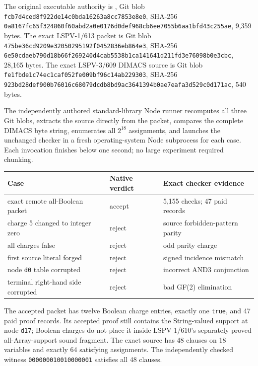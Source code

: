 \documentclass[11pt]{article}
\begin{document}
The original executable authority is
, Git blob
\texttt{fcb7d4ced8f922de14c0bda16263a8cc7853e8e0}, SHA-256
\texttt{0a8167fc65f324860f60abd2a0e0176d0def968cb6ee7055b6aa1bfd43c255ae},
9,359 bytes.  The exact LSPV-1/613 packet is Git blob
\texttt{475be36cd9209e32050295192f0452836eb864e3}, SHA-256
\texttt{6e50cdaeb790d18b66f269240d4cab5538b1ca141641d211fd3e76098b0e3cbc},
28,165 bytes.  The exact LSPV-3/609 DIMACS source is Git blob
\texttt{fe1fbde1c74ec1caf052fe009bf96c14ab229303}, SHA-256
\texttt{923bd28def900b76016c68079dcdb8bd9ac3641394b0ae7eafa3d529c0d171ac},
540 bytes.

The independently authored standard-library Node runner recomputes all three
Git blobs, extracts the source directly from the packet, compares the complete
DIMACS byte string, enumerates all $2^{18}$ assignments, and launches the
unchanged checker in a fresh operating-system Node subprocess for each case.
Each invocation finishes below one second; no large experiment required
chunking.

\begin{center}
\begin{tabular}{lll}
\toprule
Case & Native verdict & Exact checker evidence\\
\midrule
exact remote all-Boolean packet & accept & 5,155 checks; 47 paid records\\
charge 5 changed to integer zero & reject & source forbidden-pattern parity\\
all charges false & reject & odd parity charge\\
first source literal forged & reject & signed incidence mismatch\\
node \texttt{d0} table corrupted & reject & incorrect AND3 conjunction\\
terminal right-hand side corrupted & reject & bad GF(2) elimination\\
\bottomrule
\end{tabular}
\end{center}

The accepted packet has twelve Boolean charge entries, exactly one
\texttt{true}, and 47 paid proof records.  Its accepted proof still contains
the String-valued support at node \texttt{d17}; Boolean charges do not place it
inside LSPV-1/610's separately proved all-Array-support sound fragment.
The exact source has 48 clauses on 18 variables and exactly 64 satisfying
assignments.  The independently checked witness
\texttt{000000010010000001} satisfies all 48 clauses.
\end{document}
